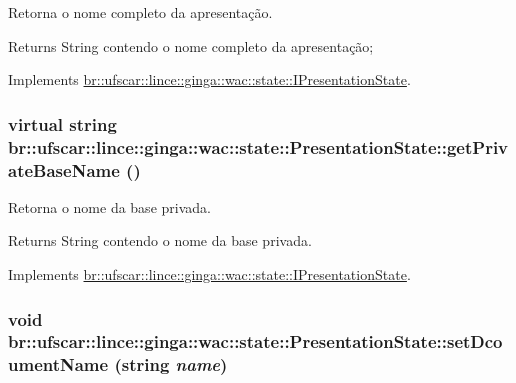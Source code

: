 Retorna o nome completo da apresentação. 

\begin{DoxyReturn}{Returns}
String contendo o nome completo da apresentação; 
\end{DoxyReturn}


Implements \hyperlink{classbr_1_1ufscar_1_1lince_1_1ginga_1_1wac_1_1state_1_1IPresentationState_a939e322cd15e49680f227bfc6b9ded9d}{br::ufscar::lince::ginga::wac::state::IPresentationState}.

\hypertarget{classbr_1_1ufscar_1_1lince_1_1ginga_1_1wac_1_1state_1_1PresentationState_a5b280537bd03a744eb41807859f01413}{
\subsubsection[{getPrivateBaseName}]{\setlength{\rightskip}{0pt plus 5cm}virtual string br::ufscar::lince::ginga::wac::state::PresentationState::getPrivateBaseName ()}}
\label{classbr_1_1ufscar_1_1lince_1_1ginga_1_1wac_1_1state_1_1PresentationState_a5b280537bd03a744eb41807859f01413}


Retorna o nome da base privada. 

\begin{DoxyReturn}{Returns}
String contendo o nome da base privada. 
\end{DoxyReturn}


Implements \hyperlink{classbr_1_1ufscar_1_1lince_1_1ginga_1_1wac_1_1state_1_1IPresentationState_a53e509fcb89622fa57b299526f96f728}{br::ufscar::lince::ginga::wac::state::IPresentationState}.

\hypertarget{classbr_1_1ufscar_1_1lince_1_1ginga_1_1wac_1_1state_1_1PresentationState_aadc7632e1bff7b0c2680a5193679e1d9}{
\subsubsection[{setDcoumentName}]{\setlength{\rightskip}{0pt plus 5cm}void br::ufscar::lince::ginga::wac::state::PresentationState::setDcoumentName (string {\em name})}}
\label{classbr_1_1ufscar_1_1lince_1_1ginga_1_1wac_1_1state_1_1PresentationState_aadc7632e1bff7b0c2680a5193679e1d9}


